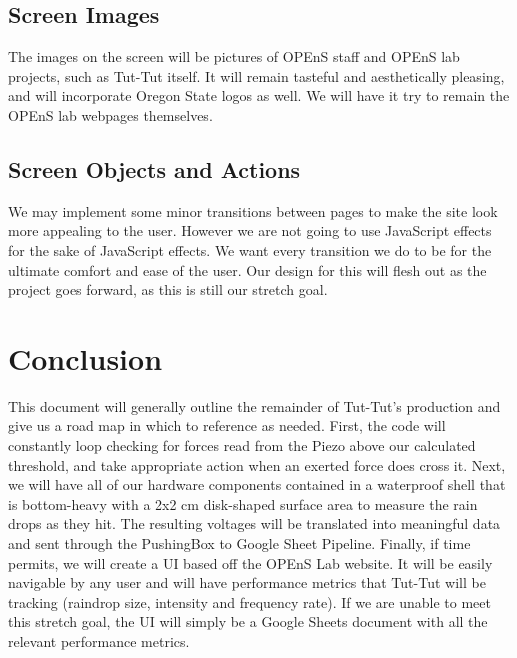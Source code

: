 \documentclass[letterpaper,10pt,draftclsnofoot,onecolumn]{article}
\begin{document}
\subsection{Screen Images}
The images on the screen will be pictures of OPEnS staff and OPEnS lab projects, such as Tut-Tut itself. It will remain tasteful and aesthetically pleasing, and will incorporate Oregon State logos as well. We will have it try to remain the OPEnS lab webpages themselves.

\subsection{Screen Objects and Actions}
We may implement some minor transitions between pages to make the site look more appealing to the user. However we are not going to use JavaScript effects for the sake of JavaScript effects. We want every transition we do to be for the ultimate comfort and ease of the user. Our design for this will flesh out as the project goes forward, as this is still our stretch goal.

\pagebreak

\section{Conclusion}
This document will generally outline the remainder of Tut-Tut's production and give us a road map in which to reference as needed. First, the code will constantly loop checking for forces read from the Piezo above our calculated threshold, and take appropriate action when an exerted force does cross it. Next, we will have all of our hardware components contained in a waterproof shell that is bottom-heavy with a 2x2 cm disk-shaped surface area to measure the rain drops as they hit. The resulting voltages will be translated into meaningful data and sent through the PushingBox to Google Sheet Pipeline. Finally, if time permits, we will create a UI based off the OPEnS Lab website. It will be easily navigable by any user and will have performance metrics that Tut-Tut will be tracking (raindrop size, intensity and frequency rate). If we are unable to meet this stretch goal, the UI will simply be a Google Sheets document with all the relevant performance metrics.

\pagebreak


\end{document}
